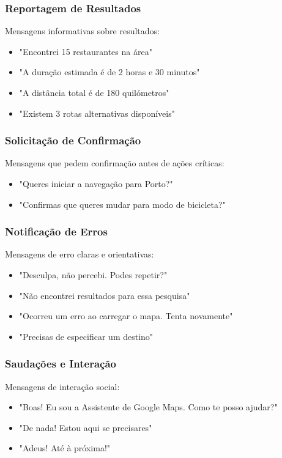 \subsubsection{Reportagem de Resultados}

Mensagens informativas sobre resultados:
\begin{itemize}
    \item "Encontrei 15 restaurantes na área"
    \item "A duração estimada é de 2 horas e 30 minutos"
    \item "A distância total é de 180 quilómetros"
    \item "Existem 3 rotas alternativas disponíveis"
\end{itemize}

\subsubsection{Solicitação de Confirmação}

Mensagens que pedem confirmação antes de ações críticas:
\begin{itemize}
    \item "Queres iniciar a navegação para Porto?"
    \item "Confirmas que queres mudar para modo de bicicleta?"
\end{itemize}

\subsubsection{Notificação de Erros}

Mensagens de erro claras e orientativas:
\begin{itemize}
    \item "Desculpa, não percebi. Podes repetir?"
    \item "Não encontrei resultados para essa pesquisa"
    \item "Ocorreu um erro ao carregar o mapa. Tenta novamente"
    \item "Precisas de especificar um destino"
\end{itemize}

\subsubsection{Saudações e Interação}

Mensagens de interação social:
\begin{itemize}
    \item "Boas! Eu sou a Assistente de Google Maps. Como te posso ajudar?"
    \item "De nada! Estou aqui se precisares"
    \item "Adeus! Até à próxima!"
\end{itemize}

